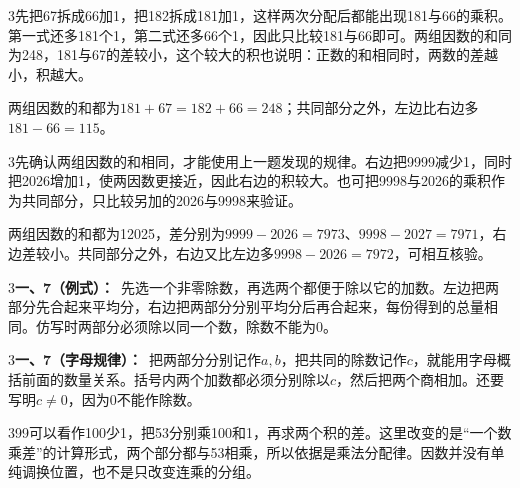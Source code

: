 \documentclass[multi=snippet,border={5bp 20bp 5bp 5bp}]{standalone}
\newenvironment{snippet}[3]{\begin{minipage}{#1bp}\color{answerred}\fontsize{#2}{#3}\selectfont\raggedright}{\end{minipage}}
\begin{document}
\begin{snippet}{505}{11.5}{14}\begin{multicols}{3}\raggedcolumns 先把67拆成66加1，把182拆成181加1，这样两次分配后都能出现181与66的乘积。第一式还多181个1，第二式还多66个1，因此只比较181与66即可。两组因数的和同为248，181与67的差较小，这个较大的积也说明：正数的和相同时，两数的差越小，积越大。\par 两组因数的和都为\(181+67=182+66=248\)\allowbreak ；共同部分之外，左边比右边多\(181-66=115\)\allowbreak 。\end{multicols}\end{snippet}
\begin{snippet}{505}{11.5}{14}\begin{multicols}{3}\raggedcolumns 先确认两组因数的和相同，才能使用上一题发现的规律。右边把9999减少1，同时把2026增加1，使两因数更接近，因此右边的积较大。也可把9998与2026的乘积作为共同部分，只比较另加的2026与9998来验证。\par 两组因数的和都为12025，差分别为\(9999-2026=7973\)\allowbreak 、\(9998-2027=7971\)\allowbreak ，右边差较小。共同部分之外，右边又比左边多\(9998-2026=7972\)\allowbreak ，可相互核验。\end{multicols}\end{snippet}
\begin{snippet}{505}{11.5}{14}\begin{multicols}{3}\raggedcolumns \textbf{一、7（例式）：}\ 先选一个非零除数，再选两个都便于除以它的加数。左边把两部分先合起来平均分，右边把两部分分别平均分后再合起来，每份得到的总量相同。仿写时两部分必须除以同一个数，除数不能为0。\end{multicols}\end{snippet}
\begin{snippet}{505}{11.5}{14}\begin{multicols}{3}\raggedcolumns \textbf{一、7（字母规律）：}\ 把两部分分别记作\(a,\allowbreak b\)\allowbreak ，把共同的除数记作\(c\)\allowbreak ，就能用字母概括前面的数量关系。括号内两个加数都必须分别除以\(c\)\allowbreak ，然后把两个商相加。还要写明\(c\ne0\)\allowbreak ，因为0不能作除数。\end{multicols}\end{snippet}
\begin{snippet}{505}{11.5}{14}\begin{multicols}{3}\raggedcolumns 99可以看作100少1，把53分别乘100和1，再求两个积的差。这里改变的是“一个数乘差”的计算形式，两个部分都与53相乘，所以依据是乘法分配律。因数并没有单纯调换位置，也不是只改变连乘的分组。\end{multicols}\end{snippet}
\end{document}
